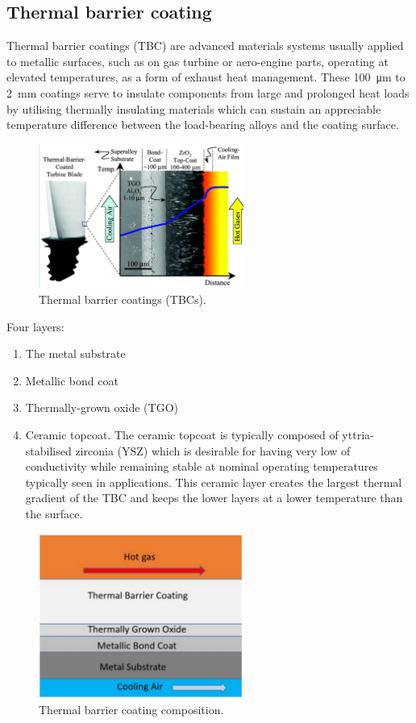 \subsection{Thermal barrier coating}
Thermal barrier coatings (TBC) are advanced materials systems usually applied to metallic surfaces, such as on gas turbine or aero-engine parts, operating at elevated temperatures, as a form of exhaust heat management. These \SI{100}{\micro\meter} to \SI{2}{mm} coatings serve to insulate components from large and prolonged heat loads by utilising thermally insulating materials which can sustain an appreciable temperature difference between the load-bearing alloys and the coating surface.
\begin{figure}[H]
    \centering
    \includegraphics[width =0.6\textwidth]{img/figure27.png}
    \caption{Thermal barrier coatings (TBCs).}
\end{figure}
Four layers:
\begin{enumerate}
    \item The metal substrate
    \item Metallic bond coat
    \item Thermally-grown oxide (TGO)
    \item Ceramic topcoat. The ceramic topcoat is typically composed of yttria-stabilised zirconia (YSZ) which is desirable for having very low of conductivity while remaining stable at nominal operating temperatures typically seen in applications. This ceramic layer creates the largest thermal gradient of the TBC and keeps the lower layers at a lower temperature than the surface.
\end{enumerate}
\begin{figure}[H]
    \centering
    \includegraphics[width =0.6\textwidth]{img/figure28.png}
    \caption{Thermal barrier coating composition.}
\end{figure}
